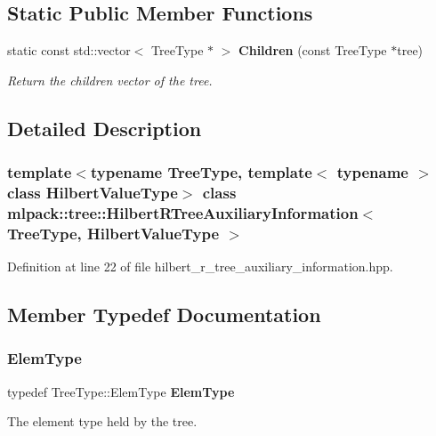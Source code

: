 \subsection*{Static Public Member Functions}
\begin{DoxyCompactItemize}
\item 
static const std\+::vector$<$ Tree\+Type $\ast$ $>$ \textbf{ Children} (const Tree\+Type $\ast$tree)
\begin{DoxyCompactList}\small\item\em Return the children vector of the tree. \end{DoxyCompactList}\end{DoxyCompactItemize}


\subsection{Detailed Description}
\subsubsection*{template$<$typename Tree\+Type, template$<$ typename $>$ class Hilbert\+Value\+Type$>$\newline
class mlpack\+::tree\+::\+Hilbert\+R\+Tree\+Auxiliary\+Information$<$ Tree\+Type, Hilbert\+Value\+Type $>$}



Definition at line 22 of file hilbert\+\_\+r\+\_\+tree\+\_\+auxiliary\+\_\+information.\+hpp.



\subsection{Member Typedef Documentation}
\mbox{\label{classmlpack_1_1tree_1_1HilbertRTreeAuxiliaryInformation_a9c50fecd9c0085e7f7ac7f770fa739ae}} 
\subsubsection{Elem\+Type}
{\footnotesize\ttfamily typedef Tree\+Type\+::\+Elem\+Type \textbf{ Elem\+Type}}



The element type held by the tree. 




